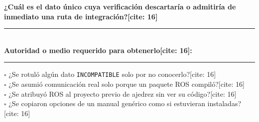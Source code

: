\documentclass[10pt, a4paper, landscape]{article}
\begin{document}
\vspace{0.15cm}
\noindent
\begin{minipage}[t]{0.49\textwidth}
    \begin{tcolorbox}[colback=white, colframe=ucbblue, title=\textbf{Dato de Mayor Poder Discriminante (Actividad 2)} {[cite: 16]}, left=2mm, right=2mm, top=1mm, bottom=1mm]
        \scriptsize\raggedright
        \textbf{¿Cuál es el dato único cuya verificación descartaría o admitiría de inmediato una ruta de integración?[cite: 16]}\\[0.25cm]
        \rule{\textwidth}{0.15mm}\\[0.25cm]
        \textbf{Autoridad o medio requerido para obtenerlo[cite: 16]:} \rule{5.5cm}{0.15mm}
    \end{tcolorbox}
\end{minipage}%
\hfill
\begin{minipage}[t]{0.49\textwidth}
    \begin{tcolorbox}[colback=red!5, colframe=red!70!black, title=\textbf{Errores Frecuentes a Auditar Antes de Entregar} {[cite: 16]}, left=2mm, right=2mm, top=1mm, bottom=1mm]
        \scriptsize\raggedright
        $\square$ ¿Se rotuló algún dato \texttt{INCOMPATIBLE} solo por no conocerlo?[cite: 16]\\
        $\square$ ¿Se asumió comunicación real solo porque un paquete ROS compiló?[cite: 16]\\
        $\square$ ¿Se atribuyó ROS al proyecto previo de ajedrez sin ver su código?[cite: 16]\\
        $\square$ ¿Se copiaron opciones de un manual genérico como si estuvieran instaladas?[cite: 16]
    \end{tcolorbox}
\end{minipage}
\end{document}
